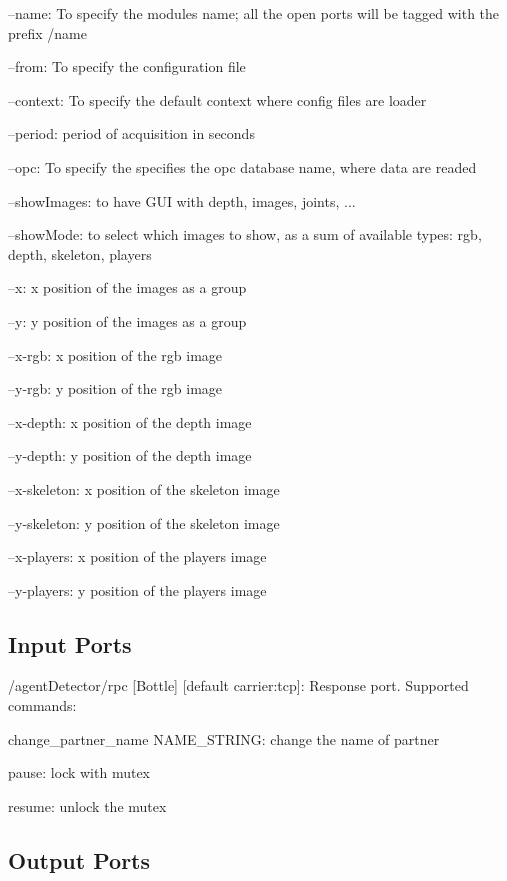 \begin{DoxyItemize}
\item --name\+: To specify the module\textquotesingle{}s name; all the open ports will be tagged with the prefix /name
\item --from\+: To specify the configuration file
\item --context\+: To specify the default context where config files are loader
\item --period\+: period of acquisition in seconds
\item --opc\+: To specify the specifies the opc database name, where data are readed
\item --show\+Images\+: to have G\+UI with depth, images, joints, ...
\item --show\+Mode\+: to select which images to show, as a sum of available types\+: rgb, depth, skeleton, players
\item --x\+: x position of the images as a group
\item --y\+: y position of the images as a group
\item --x-\/rgb\+: x position of the rgb image
\item --y-\/rgb\+: y position of the rgb image
\item --x-\/depth\+: x position of the depth image
\item --y-\/depth\+: y position of the depth image
\item --x-\/skeleton\+: x position of the skeleton image
\item --y-\/skeleton\+: y position of the skeleton image
\item --x-\/players\+: x position of the players image
\item --y-\/players\+: y position of the players image 
\end{DoxyItemize}\hypertarget{group__touchDetector_inputports_sec}{}\subsection{Input Ports}\label{group__touchDetector_inputports_sec}

\begin{DoxyItemize}
\item /agent\+Detector/rpc \mbox{[}Bottle\mbox{]} \mbox{[}default carrier\+:tcp\mbox{]}\+: Response port. Supported commands\+:
\begin{DoxyItemize}
\item change\+\_\+partner\+\_\+name N\+A\+M\+E\+\_\+\+S\+T\+R\+I\+NG\+: change the name of partner
\item pause\+: lock with mutex
\item resume\+: unlock the mutex
\end{DoxyItemize}
\end{DoxyItemize}\hypertarget{group__touchDetector_outputports_sec}{}\subsection{Output Ports}\label{group__touchDetector_outputports_sec}

